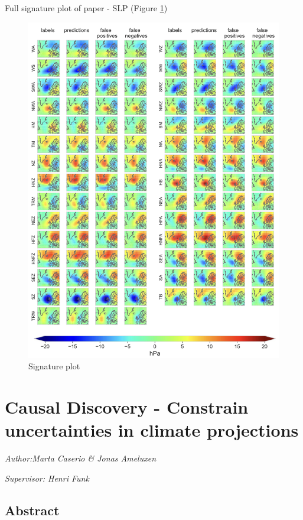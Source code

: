 \documentclass[
]{krantz}
\begin{document}
Full signature plot of paper - SLP (Figure \ref{fig:sigfullpaper}) \citep{Mittermeier2022}

\begin{figure}

{\centering \includegraphics[width=0.7\linewidth]{work/01-weatherpattern/figures/paper/slp_signature_plots_all} 

}

\caption{Signature plot}\label{fig:sigfullpaper}
\end{figure}

\chapter{Causal Discovery - Constrain uncertainties in climate projections}\label{causal-discovery---constrain-uncertainties-in-climate-projections}

\emph{Author:Marta Caserio \& Jonas Ameluxen }

\emph{Supervisor: Henri Funk}

\section{Abstract}\label{abstract-1}
\end{document}
